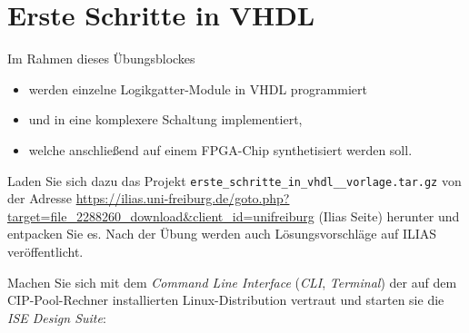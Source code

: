 \documentclass[12pt]{article}
\begin{document}




\part*{Erste Schritte in VHDL}


Im Rahmen dieses Übungsblockes
\vspace*{-5pt}
\begin{itemize}
    \setlength\itemsep{-5pt}
    \item werden einzelne Logikgatter-Module in VHDL programmiert
    \item und in eine komplexere Schaltung implementiert,
    \item welche anschließend auf einem FPGA-Chip synthetisiert werden soll.
\end{itemize}


Laden Sie sich dazu das Projekt \texttt{erste\_schritte\_in\_vhdl\_\_vorlage.tar.gz}
von der Adresse \url{https://ilias.uni-freiburg.de/goto.php?target=file_2288260_download&client_id=unifreiburg} (Ilias Seite)  herunter und entpacken Sie es.
Nach der Übung werden auch Lösungsvorschläge auf ILIAS veröffentlicht.







Machen Sie sich mit dem \textit{Command Line Interface} (\textit{CLI}, \textit{Terminal}) der auf dem CIP-Pool-Rechner installierten Linux-Distribution vertraut
und starten sie die \textit{ISE Design Suite}:
\end{document}
